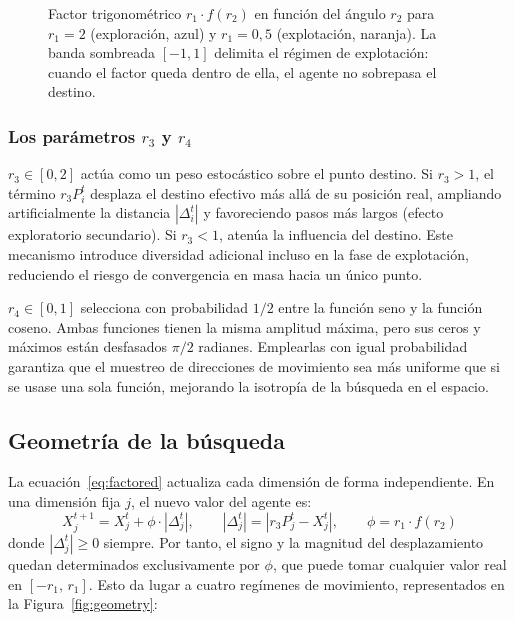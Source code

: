 \documentclass[12pt,a4paper]{article}
\begin{document}
\begin{figure}[H]
\caption{Factor trigonométrico $r_1 \cdot f(r_2)$ en función del ángulo $r_2$ para $r_1=2$ (exploración, azul) y $r_1=0{,}5$ (explotación, naranja). La banda sombreada $[-1,1]$ delimita el régimen de explotación: cuando el factor queda dentro de ella, el agente no sobrepasa el destino.}
\label{fig:trig}
\end{figure}

\subsubsection{Los parámetros $r_3$ y $r_4$}

$r_3 \in [0, 2]$ actúa como un peso estocástico sobre el punto destino. Si $r_3 > 1$, el término $r_3 P_i^t$ desplaza el destino efectivo más allá de su posición real, ampliando artificialmente la distancia $|\Delta_i^t|$ y favoreciendo pasos más largos (efecto exploratorio secundario). Si $r_3 < 1$, atenúa la influencia del destino. Este mecanismo introduce diversidad adicional incluso en la fase de explotación, reduciendo el riesgo de convergencia en masa hacia un único punto.

$r_4 \in [0,1]$ selecciona con probabilidad $1/2$ entre la función seno y la función coseno. Ambas funciones tienen la misma amplitud máxima, pero sus ceros y máximos están desfasados $\pi/2$ radianes. Emplearlas con igual probabilidad garantiza que el muestreo de direcciones de movimiento sea más uniforme que si se usase una sola función, mejorando la isotropía de la búsqueda en el espacio.

\subsection{Geometría de la búsqueda}

La ecuación~\eqref{eq:factored} actualiza cada dimensión de forma independiente. En una dimensión fija $j$, el nuevo valor del agente es:
\[
  X_j^{t+1} = X_j^t + \phi \cdot |\Delta_j^t|,
  \qquad |\Delta_j^t| = |r_3 P_j^t - X_j^t|, \qquad \phi = r_1 \cdot f(r_2)
\]
donde $|\Delta_j^t| \geq 0$ siempre. Por tanto, el signo y la magnitud del desplazamiento quedan determinados exclusivamente por $\phi$, que puede tomar cualquier valor real en $[-r_1,\, r_1]$. Esto da lugar a cuatro regímenes de movimiento, representados en la Figura~\ref{fig:geometry}:
\end{document}

